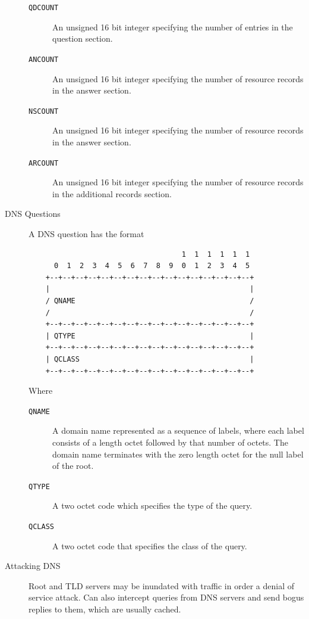 \documentclass{article}
\begin{document}
\begin{description}
\begin{description}
        \item[{\tt QDCOUNT}] An unsigned 16 bit integer specifying the number of entries in the question section.
        \item[{\tt ANCOUNT}] An unsigned 16 bit integer specifying the number of resource records in the answer section.
        \item[{\tt NSCOUNT}] An unsigned 16 bit integer specifying the number of resource records in the answer section.
        \item[{\tt ARCOUNT}] An unsigned 16 bit integer specifying the number of resource records in the additional records section.
    \end{description}
    
    \item[DNS Questions]
    A DNS question has the format
    \begin{lstlisting}
                                    1  1  1  1  1  1
      0  1  2  3  4  5  6  7  8  9  0  1  2  3  4  5
    +--+--+--+--+--+--+--+--+--+--+--+--+--+--+--+--+
    |                                               |
    / QNAME                                         /
    /                                               /
    +--+--+--+--+--+--+--+--+--+--+--+--+--+--+--+--+
    | QTYPE                                         |
    +--+--+--+--+--+--+--+--+--+--+--+--+--+--+--+--+
    | QCLASS                                        |
    +--+--+--+--+--+--+--+--+--+--+--+--+--+--+--+--+
    \end{lstlisting}
    Where
    
    \begin{description}
        \item[{\tt QNAME}] A domain name represented as a sequence of labels, where each label consists of a length octet followed by that number of octets. The domain name terminates with the zero length octet for the null label of the root.
        \item[{\tt QTYPE}] A two octet code which specifies the type of the query.
        \item[{\tt QCLASS}] A two octet code that specifies the class of the query.
    \end{description}
    
    \item[Attacking DNS] Root and TLD servers may be inundated with traffic in order a denial of 
    service attack. Can also intercept queries from DNS servers and send bogus replies to them, which
    are usually cached.


\end{description}
\end{document}
